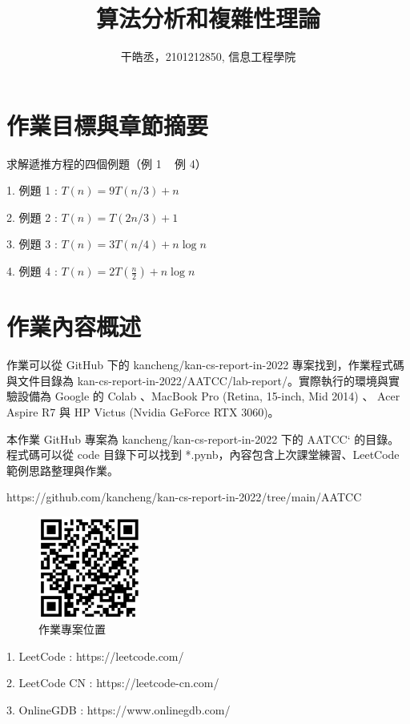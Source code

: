 \documentclass[10pt,UTF8]{ctexart}
\title{算法分析和複雜性理論}
\author{干皓丞，2101212850, 信息工程學院}
\begin{document}
\maketitle


\section{作業目標與章節摘要}

求解遞推方程的四個例題（例 1 ~ 例 4）

1. 例題 1 : $T(n) =  9T(n/3) + n$

2. 例題 2 : $T(n) = T(2n /3) + 1$

3. 例題 3 : $T(n) = 3T(n/4) + n\log n$

4. 例題 4 : $T(n) = 2T( \frac{n}{2}) + n \log n $

\section{作業內容概述}

作業可以從 GitHub 下的 kancheng/kan-cs-report-in-2022 專案找到，作業程式碼與文件目錄為 kan-cs-report-in-2022/AATCC/lab-report/。實際執行的環境與實驗設備為 Google 的 Colab 、MacBook Pro (Retina, 15-inch, Mid 2014) 、 Acer Aspire R7 與 HP Victus (Nvidia GeForce RTX 3060)。

本作業 GitHub 專案為 kancheng/kan-cs-report-in-2022 下的 AATCC` 的目錄。程式碼可以從 code 目錄下可以找到 *.pynb，內容包含上次課堂練習、LeetCode 範例思路整理與作業。

https://github.com/kancheng/kan-cs-report-in-2022/tree/main/AATCC

\begin{figure}[H]
\centering 
\includegraphics[width=0.30\textwidth]{aatccqr.png} 
\caption{作業專案位置}
\label{Test}
\end{figure}

1. LeetCode : https://leetcode.com/

2. LeetCode CN : https://leetcode-cn.com/

3. OnlineGDB : https://www.onlinegdb.com/ 
\end{document}
